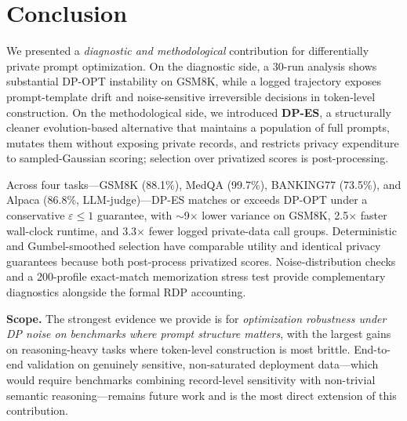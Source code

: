\section{Conclusion}
\label{sec:conclusion}

We presented a \emph{diagnostic and methodological} contribution for differentially private prompt optimization. On the diagnostic side, a 30-run analysis shows substantial DP-OPT instability on GSM8K, while a logged trajectory exposes prompt-template drift and noise-sensitive irreversible decisions in token-level construction. On the methodological side, we introduced \textbf{DP-ES}, a structurally cleaner evolution-based alternative that maintains a population of full prompts, mutates them without exposing private records, and restricts privacy expenditure to sampled-Gaussian scoring; selection over privatized scores is post-processing.

Across four tasks---GSM8K (88.1\%), MedQA (99.7\%), BANKING77 (73.5\%), and Alpaca (86.8\%, LLM-judge)---DP-ES matches or exceeds DP-OPT under a conservative $\varepsilon\leq1$ guarantee, with $\sim$9$\times$ lower variance on GSM8K, 2.5$\times$ faster wall-clock runtime, and 3.3$\times$ fewer logged private-data call groups. Deterministic and Gumbel-smoothed selection have comparable utility and identical privacy guarantees because both post-process privatized scores. Noise-distribution checks and a 200-profile exact-match memorization stress test provide complementary diagnostics alongside the formal RDP accounting.

\noindent\textbf{Scope.} The strongest evidence we provide is for \emph{optimization robustness under DP noise on benchmarks where prompt structure matters}, with the largest gains on reasoning-heavy tasks where token-level construction is most brittle. End-to-end validation on genuinely sensitive, non-saturated deployment data---which would require benchmarks combining record-level sensitivity with non-trivial semantic reasoning---remains future work and is the most direct extension of this contribution.
